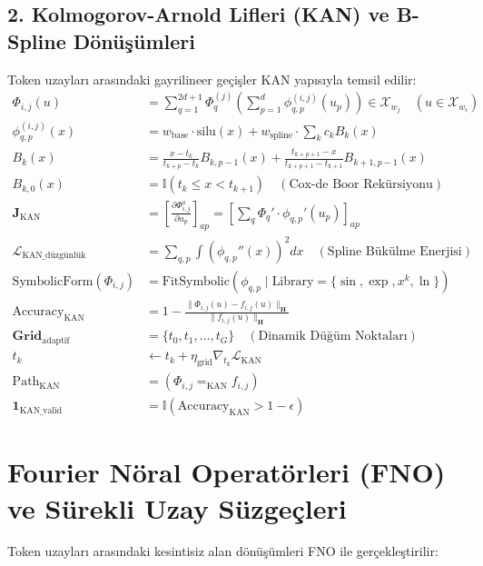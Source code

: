\documentclass[11pt, a4paper]{article}
\begin{document}
\subsection{2. Kolmogorov-Arnold Lifleri (KAN) ve B-Spline Dönüşümleri}
Token uzayları arasındaki gayrilineer geçişler KAN yapısıyla temsil edilir:
\begin{align}
\Phi_{i,j}(u) &= \sum_{q=1}^{2d+1} \Phi_q^{(j)} \left( \sum_{p=1}^d \phi_{q,p}^{(i,j)}(u_p) \right) \in \mathcal{X}_{w_j} \quad (u \in \mathcal{X}_{w_i}) \\
\phi_{q,p}^{(i,j)}(x) &= w_{\text{base}} \cdot \text{silu}(x) + w_{\text{spline}} \cdot \sum_k c_k B_k(x) \\
B_k(x) &= \frac{x - t_k}{t_{k+p} - t_k} B_{k, p-1}(x) + \frac{t_{k+p+1} - x}{t_{k+p+1} - t_{k+1}} B_{k+1, p-1}(x) \\
B_{k, 0}(x) &= \mathbb{I}(t_k \le x < t_{k+1}) \quad (\text{Cox-de Boor Rekürsiyonu}) \\
\mathbf{J}_{\text{KAN}} &= \left[ \frac{\partial \Phi_{i,j}^a}{\partial u_p} \right]_{ap} = \left[ \sum_q \Phi_q' \cdot \phi_{q,p}'(u_p) \right]_{ap} \\
\mathcal{L}_{\text{KAN\_düzgünlük}} &= \sum_{q,p} \int \left( \phi_{q,p}''(x) \right)^2 dx \quad (\text{Spline Bükülme Enerjisi}) \\
\text{SymbolicForm}(\Phi_{i,j}) &= \text{FitSymbolic}(\phi_{q,p} \mid \text{Library}=\{\sin, \exp, x^k, \ln\}) \\
\text{Accuracy}_{\text{KAN}} &= 1 - \frac{\|\Phi_{i,j}(u) - f_{i,j}(u)\|_{\mathbf{H}}}{\|f_{i,j}(u)\|_{\mathbf{H}}} \\
\mathbf{Grid}_{\text{adaptif}} &= \{t_0, t_1, \dots, t_G\} \quad (\text{Dinamik Düğüm Noktaları}) \\
t_k &\leftarrow t_k + \eta_{\text{grid}} \nabla_{t_k} \mathcal{L}_{\text{KAN}} \\
\text{Path}_{\text{KAN}} &= (\Phi_{i,j} =_{\text{KAN}} f_{i,j}) \\
\mathbf{1}_{\text{KAN\_valid}} &= \mathbb{I}\left( \text{Accuracy}_{\text{KAN}} > 1 - \epsilon \right)
\end{align}

\section{Fourier Nöral Operatörleri (FNO) ve Sürekli Uzay Süzgeçleri}

Token uzayları arasındaki kesintisiz alan dönüşümleri FNO ile gerçekleştirilir:
\end{document}

